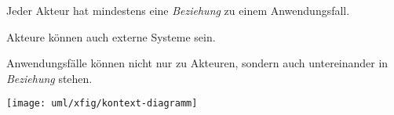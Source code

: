 \begin{minipage}[c]{0.45\linewidth}
Jeder Akteur hat mindestens eine \emph{Beziehung} zu einem Anwendungsfall.

Akteure können auch externe Systeme sein.

%

Anwendungsf\"alle k\"onnen nicht nur zu Akteuren,
sondern auch untereinander in \emph{Beziehung} stehen.

%
%
\newpage
\ifslides
\texttt{[image: uml/xfig/kontext-diagramm]}
\else

\end{minipage}
